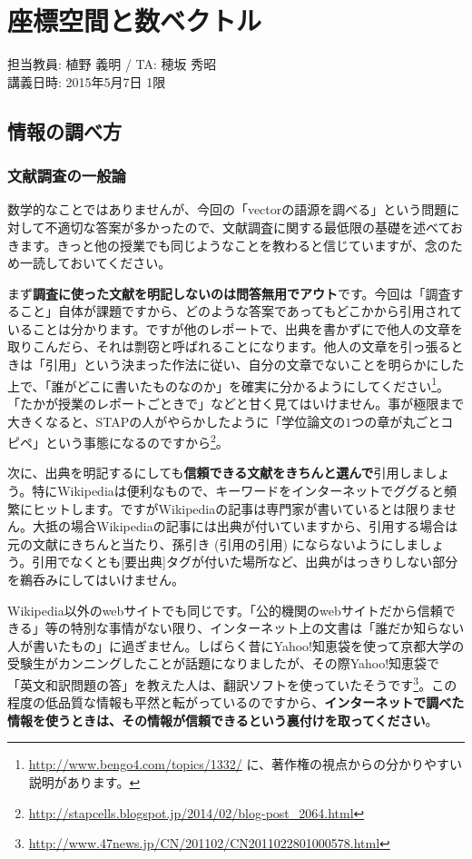 \chapter{座標空間と数ベクトル}

\begin{flushright}
担当教員: 植野 義明 / TA: 穂坂 秀昭 \\
講義日時: 2015年5月7日 1限
\end{flushright}

\section{情報の調べ方}

\subsection{文献調査の一般論}

数学的なことではありませんが、今回の「vectorの語源を調べる」という問題に対して不適切な答案が多かったので、文献調査に関する最低限の基礎を述べておきます。きっと他の授業でも同じようなことを教わると信じていますが、念のため一読しておいてください。

まず\textbf{調査に使った文献を明記しないのは問答無用でアウト}です。今回は「調査すること」自体が課題ですから、どのような答案であってもどこかから引用されていることは分かります。ですが他のレポートで、出典を書かずにで他人の文章を取りこんだら、それは剽窃と呼ばれることになります。他人の文章を引っ張るときは「引用」という決まった作法に従い、自分の文章でないことを明らかにした上で、「誰がどこに書いたものなのか」を確実に分かるようにしてください\footnote{\url{http://www.bengo4.com/topics/1332/} に、著作権の視点からの分かりやすい説明があります。}。「たかが授業のレポートごときで」などと甘く見てはいけません。事が極限まで大きくなると、STAPの人がやらかしたように「学位論文の$1$つの章が丸ごとコピペ」という事態になるのですから\footnote{\url{http://stapcells.blogspot.jp/2014/02/blog-post_2064.html}}。

次に、出典を明記するにしても\textbf{信頼できる文献をきちんと選んで}引用しましょう。特にWikipediaは便利なもので、キーワードをインターネットでググると頻繁にヒットします。ですがWikipediaの記事は専門家が書いているとは限りません。大抵の場合Wikipediaの記事には出典が付いていますから、引用する場合は元の文献にきちんと当たり、孫引き (引用の引用) にならないようにしましょう。引用でなくとも[要出典]タグが付いた場所など、出典がはっきりしない部分を鵜呑みにしてはいけません。

Wikipedia以外のwebサイトでも同じです。「公的機関のwebサイトだから信頼できる」等の特別な事情がない限り、インターネット上の文書は「誰だか知らない人が書いたもの」に過ぎません。しばらく昔にYahoo!知恵袋を使って京都大学の受験生がカンニングしたことが話題になりましたが、その際Yahoo!知恵袋で「英文和訳問題の答」を教えた人は、翻訳ソフトを使っていたそうです\footnote{\url{http://www.47news.jp/CN/201102/CN2011022801000578.html}}。この程度の低品質な情報も平然と転がっているのですから、\textbf{インターネットで調べた情報を使うときは、その情報が信頼できるという裏付けを取ってください}。

